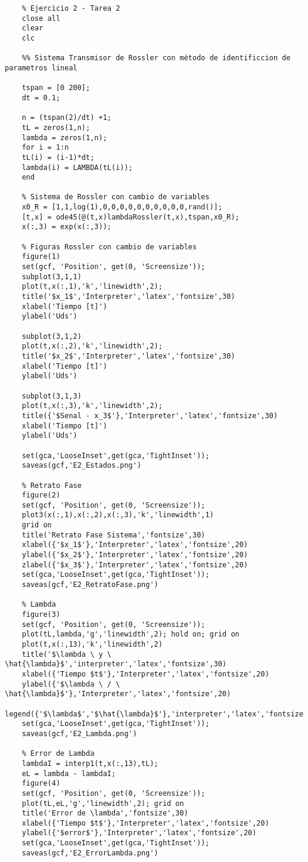 	\begin{verbatim}
	% Ejercicio 2 - Tarea 2
	close all
	clear
	clc
	
	%% Sistema Transmisor de Rossler con método de identificcion de parametros lineal
	
	tspan = [0 200];
	dt = 0.1;
	
	n = (tspan(2)/dt) +1;
	tL = zeros(1,n);
	lambda = zeros(1,n);
	for i = 1:n
	tL(i) = (i-1)*dt;
	lambda(i) = LAMBDA(tL(i));
	end
	
	% Sistema de Rossler con cambio de variables
	x0_R = [1,1,log(1),0,0,0,0,0,0,0,0,0,0,rand()];
	[t,x] = ode45(@(t,x)lambdaRossler(t,x),tspan,x0_R);
	x(:,3) = exp(x(:,3));
	
	% Figuras Rossler con cambio de variables
	figure(1)
	set(gcf, 'Position', get(0, 'Screensize'));
	subplot(3,1,1)
	plot(t,x(:,1),'k','linewidth',2);
	title('$x_1$','Interpreter','latex','fontsize',30)
	xlabel('Tiempo [t]')
	ylabel('Uds')
	
	subplot(3,1,2)
	plot(t,x(:,2),'k','linewidth',2);
	title('$x_2$','Interpreter','latex','fontsize',30)
	xlabel('Tiempo [t]')
	ylabel('Uds')
	
	subplot(3,1,3)
	plot(t,x(:,3),'k','linewidth',2);
	title({'$Senal - x_3$'},'Interpreter','latex','fontsize',30)
	xlabel('Tiempo [t]')
	ylabel('Uds')
	
	set(gca,'LooseInset',get(gca,'TightInset'));
	saveas(gcf,'E2_Estados.png')
	
	% Retrato Fase
	figure(2)
	set(gcf, 'Position', get(0, 'Screensize'));
	plot3(x(:,1),x(:,2),x(:,3),'k','linewidth',1)
	grid on
	title('Retrato Fase Sistema','fontsize',30)
	xlabel({'$x_1$'},'Interpreter','latex','fontsize',20)
	ylabel({'$x_2$'},'Interpreter','latex','fontsize',20)
	zlabel({'$x_3$'},'Interpreter','latex','fontsize',20)
	set(gca,'LooseInset',get(gca,'TightInset'));
	saveas(gcf,'E2_RetratoFase.png')
	
	% Lambda
	figure(3)
	set(gcf, 'Position', get(0, 'Screensize'));
	plot(tL,lambda,'g','linewidth',2); hold on; grid on
	plot(t,x(:,13),'k','linewidth',2)
	title('$\lambda \ y \ \hat{\lambda}$','interpreter','latex','fontsize',30)
	xlabel({'Tiempo $t$'},'Interpreter','latex','fontsize',20)
	ylabel({'$\lambda \ / \ \hat{\lambda}$'},'Interpreter','latex','fontsize',20)
	legend({'$\lambda$','$\hat{\lambda}$'},'interpreter','latex','fontsize',16)
	set(gca,'LooseInset',get(gca,'TightInset'));
	saveas(gcf,'E2_Lambda.png')
	
	% Error de Lambda
	lambdaI = interp1(t,x(:,13),tL);
	eL = lambda - lambdaI;
	figure(4)
	set(gcf, 'Position', get(0, 'Screensize'));
	plot(tL,eL,'g','linewidth',2); grid on
	title('Error de \lambda','fontsize',30)
	xlabel({'Tiempo $t$'},'Interpreter','latex','fontsize',20)
	ylabel({'$error$'},'Interpreter','latex','fontsize',20)
	set(gca,'LooseInset',get(gca,'TightInset'));
	saveas(gcf,'E2_ErrorLambda.png')
	

\end{verbatim}
